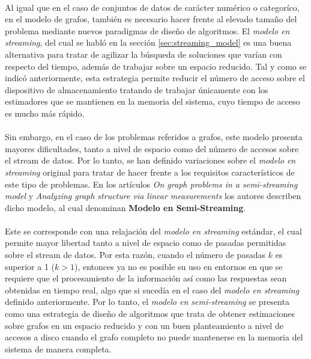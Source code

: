 \documentclass{subfiles}
\begin{document}
      \paragraph{}
      Al igual que en el caso de conjuntos de datos de carácter numérico o categoríco, en el modelo de grafos, también es necesario hacer frente al elevado tamaño del problema mediante nuevos paradigmas de diseño de algoritmos. El \emph{modelo en streaming}, del cual se habló en la sección \ref{sec:streaming_model} es una buena alternativa para tratar de agilizar la búsqueda de soluciones que varían con respecto del tiempo, además de trabajar sobre un espacio reducido. Tal y como se indicó anteriormente, esta estrategia permite reducir el número de acceso sobre el dispositivo de almacenamiento tratando de trabajar únicamente con los estimadores que se mantienen en la memoria del sistema, cuyo tiempo de acceso es mucho más rápido.

      \paragraph{}
      Sin embargo, en el caso de los problemas referidos a grafos, este modelo presenta mayores dificultades, tanto a nivel de espacio como del número de accesos sobre el stream de datos. Por lo tanto, se han definido variaciones sobre el \emph{modelo en streaming} original para tratar de hacer frente a los requisitos característicos de este tipo de problemas. En los artículos \emph{On graph problems in a semi-streaming model} \cite{feigenbaum2005graph} y \emph{Analyzing graph structure via linear measurements} \cite{ahn2012analyzing} los autores describen dicho modelo, al cual denominan \textbf{Modelo en Semi-Streaming}.

      \paragraph{}
      Este se corresponde con una relajación del \emph{modelo en streaming} estándar, el cual permite mayor libertad tanto a nivel de espacio como de pasadas permitidas sobre el stream de datos. Por esta razón, cuando el número de pasadas  $k$ es superior a 1 ($k > 1$), entonces ya no es posible su uso en entornos en que se requiere que el procesamiento de la información así como las respuestas sean obtenidas en tiempo real, algo que si sucedía en el caso del \emph{modelo en streaming} definido anteriormente. Por lo tanto, el \emph{modelo en semi-streaming} se presenta como una estrategia de diseño de algoritmos que trata de obtener estimaciones sobre grafos en un espacio reducido y con un buen planteamiento a nivel de accesos a disco cuando el grafo completo no puede mantenerse en la memoria del sistema de manera completa.
\end{document}
